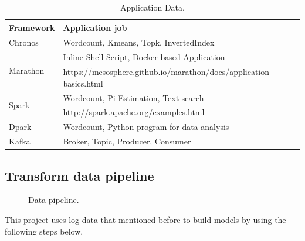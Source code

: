 \documentclass[12pt,oneside,openright,a4paper]{cpe-english-project}
\begin{document}
\begin{table}[!h]
  \caption{Application Data.}\label{tbl:ApplicationData}
    \begin{tabular}{@{}|p{}|p{}|}
    \hline
    \textbf{Framework} & \textbf{Application job}\\
    \hline
    Chronos & Wordcount, Kmeans, Topk, InvertedIndex\\
    \hline
    \multirow{2}{*}{Marathon} & Inline Shell Script, Docker based Application \\
    & https://mesosphere.github.io/marathon/docs/application-basics.html\\
    \hline
    \multirow{2}{*}{Spark} & Wordcount, Pi Estimation, Text search\\
    & http://spark.apache.org/examples.html\\
    \hline
    Dpark & Wordcount, Python program for data analysis\\
    \hline
    Kafka & Broker, Topic, Producer, Consumer\\
    \hline
  \end{tabular}
\end{table}

\newpage

\subsection{Transform data pipeline}

\begin{figure}[!h]\centering
  \setlength{\fboxrule}{0mm} %
  \setlength{\fboxsep}{0cm}
  \caption{Data pipeline.}\label{fig:dataPipeline}
\end{figure}

This project uses log data that mentioned before to build models by using the following steps below.
\end{document}
